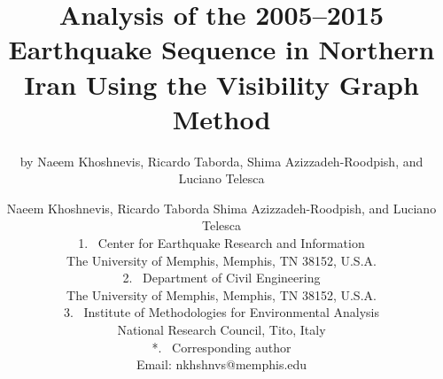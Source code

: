 
\title{%
    Analysis of the 2005--2015 Earthquake Sequence in Northern Iran Using the Visibility Graph Method
}

\makeatletter
\if@twocolumn
    \date{}
    \renewcommand*\@fnsymbol[1]{\the#1}
    \author{by Naeem Khoshnevis, Ricardo Taborda, Shima Azizzadeh-Roodpish, and Luciano Telesca}
\else
    \author{
        Naeem Khoshnevis, Ricardo Taborda Shima Azizzadeh-Roodpish, and Luciano Telesca\\
        \normalsize\normalfont    	    	
        \vspace{20pt}
        1.~
        Center for Earthquake Research and Information\\
        \hspace{1.1em} The University of Memphis, Memphis, TN 38152, U.S.A.\\
        \vspace{20pt}
        2.~
        Department of Civil Engineering\\
        \hspace{1.1em} The University of Memphis, Memphis, TN 38152, U.S.A.\\
        \vspace{20pt}
        3.~
        Institute of Methodologies for Environmental Analysis\\
        \hspace{1.1em} National Research Council, Tito, Italy\\
        \vspace{20pt}
        *.~
        Corresponding author\\
        \hspace{1.1em} Email: nkhshnvs@memphis.edu\\
        \vspace{40pt}
    }
\fi
\makeatother

